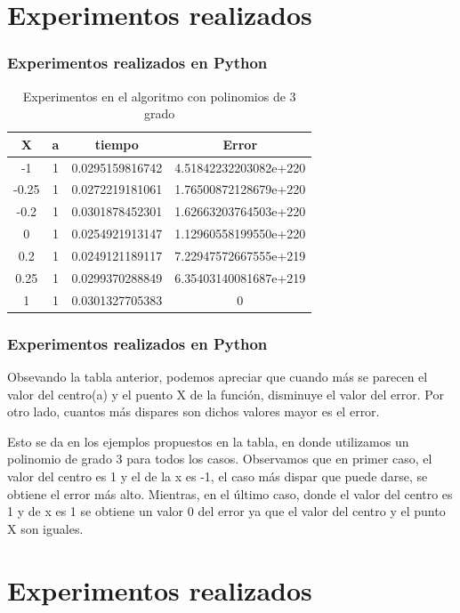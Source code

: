 \documentclass{beamer}
\begin{document}
\section{Experimentos realizados}

\begin{frame}
\frametitle{Experimentos realizados en \textsf{Python}}
\begin{table}{}
 \begin{center}
  \begin{tabular}{|c|c|c|c|}
   \hline
   X     &a& tiempo            & Error \\ \hline
   -1    &1&0.0295159816742    & 4.51842232203082e+220 \\ \hline
   -0.25 &1&0.0272219181061    & 1.76500872128679e+220 \\ \hline
   -0.2  &1&0.0301878452301    & 1.62663203764503e+220 \\ \hline     
   0     &1&0.0254921913147    & 1.12960558199550e+220 \\ \hline
   0.2   &1&0.0249121189117    & 7.22947572667555e+219 \\ \hline
   0.25  &1&0.0299370288849    & 6.35403140081687e+219 \\ \hline
   1     &1&0.0301327705383    & 0 \\ \hline
\end{tabular}
\end{center}
\caption{Experimentos en el algoritmo con polinomios de 3 grado}
\label{tab}
\end{table}
\end{frame}
\begin{frame}
\frametitle{Experimentos realizados en \textsf{Python}}
Obsevando la tabla anterior, podemos apreciar que cuando más se parecen el valor del centro(a) y el puento X de la función, disminuye el valor del error. Por otro lado, cuantos más dispares son dichos valores mayor es el error.\par 

Esto se da en los ejemplos propuestos en la tabla, en donde utilizamos un polinomio de grado 3 para todos los casos. Observamos que en primer caso, el valor del centro es 1 y el de la x es -1, el caso más dispar que puede darse, se obtiene el error más alto. Mientras, en el último caso, donde el valor del centro es 1 y de x es 1 se obtiene un valor 0 del error ya que el valor del centro y el punto X son iguales.
\end{frame}

\section{Experimentos realizados}
\end{document}
